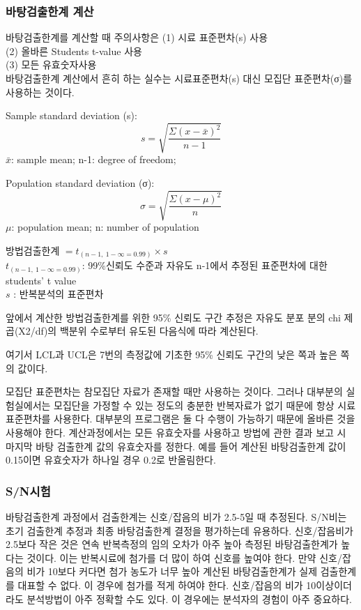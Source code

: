 \documentclass[
]{book}
\begin{document}
\hypertarget{uxbc14uxd0d5uxac80uxcd9cuxd55cuxacc4-uxacc4uxc0b0}{%
\subsubsection{바탕검출한계 계산}\label{uxbc14uxd0d5uxac80uxcd9cuxd55cuxacc4-uxacc4uxc0b0}}

바탕검출한계를 계산할 때 주의사항은
(1) 시료 표준편차(s) 사용\\
(2) 올바른 Students t-value 사용\\
(3) 모든 유효숫자사용\\
바탕검출한계 계산에서 흔히 하는 실수는 시료표준편차(s) 대신 모집단 표준편차(σ)를 사용하는 것이다.

Sample standard deviation (s):\\
\[
s=\sqrt{\frac {\Sigma {(x- \bar x)}^{2}} {n-1}}
\]
\(\bar x\): sample mean; n-1: degree of freedom;

Population standard deviation (σ):
\[
\sigma=\sqrt{\frac {\Sigma {(x- \mu)}^{2}} {n}}
\]
\(\mu\): population mean; n: number of population

방법검출한계 \(={t_{(n-1, ~1-\infty=0.99)}\times s}\)\\
\(t_{(n-1, ~1-\infty=0.99)}\): 99\%신뢰도 수준과 자유도 n-1에서 추정된 표준편차에 대한 students' t value\\
\(s\) : 반복분석의 표준편차

앞에서 계산한 방법검출한계를 위한 95\% 신뢰도 구간 추정은 자유도 분포 분의 chi 제곱(X2/df)의 백분위 수로부터 유도된 다음식에 따라 계산된다.

여기서 LCL과 UCL은 7번의 측정값에 기초한 95\% 신뢰도 구간의 낮은 쪽과 높은 쪽의 값이다.

모집단 표준편차는 참모집단 자료가 존재할 때만 사용하는 것이다. 그러나 대부분의 실험실에서는 모집단을 가정할 수 있는 정도의 충분한 반복자료가 없기 때문에 항상 시료 표준편차를 사용한다. 대부분의 프로그램은 둘 다 수행이 가능하기 때문에 올바른 것을 사용해야 한다. 계산과정에서는 모든 유효숫자를 사용하고 방법에 관한 결과 보고 시 마지막 바탕 검출한계 값의 유효숫자를 정한다. 예를 들어 계산된 바탕검출한계 값이 0.15이면 유효숫자가 하나일 경우 0.2로 반올림한다.

\hypertarget{snuxc2dcuxd5d8}{%
\subsubsection{S/N시험}\label{snuxc2dcuxd5d8}}

바탕검출한계 과정에서 검출한계는 신호/잡음의 비가 2.5-5일 때 추정된다. S/N비는 초기 검출한계 추정과 최종 바탕검출한계 결정을 평가하는데 유용하다. 신호/잡음비가 2.5보다 작은 것은 연속 반복측정의 임의 오차가 아주 높아 측정된 바탕검출한계가 높다는 것이다. 이는 반복시료에 첨가를 더 많이 하여 신호를 높여야 한다. 만약 신호/잡음의 비가 10보다 커다면 첨가 농도가 너무 높아 계산된 바탕검출한계가 실제 검출한계를 대표할 수 없다. 이 경우에 첨가를 적게 하여야 한다. 신호/잡음의 비가 10이상이더라도 분석방법이 아주 정확할 수도 있다. 이 경우에는 분석자의 경험이 아주 중요하다.
\end{document}
